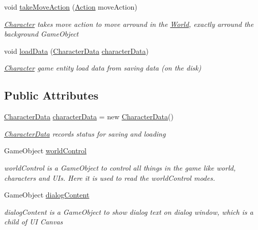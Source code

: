\begin{DoxyCompactItemize}
void \hyperlink{classdoki_unity_1_1_character_a1531b23b9fe3dd18c6ed37ce6d67c5a6}{take\+Move\+Action} (\hyperlink{classdoki_script_setting_1_1_action}{Action} move\+Action)
\begin{DoxyCompactList}\small\item\em \hyperlink{classdoki_unity_1_1_character}{Character} takes move action to move arround in the \hyperlink{classdoki_unity_1_1_world}{World}, exactly arround the background Game\+Object \end{DoxyCompactList}\item 
void \hyperlink{classdoki_unity_1_1_character_a9cfc21b81d39cdb038dc074705603aea}{load\+Data} (\hyperlink{classdoki_unity_1_1_character_data}{Character\+Data} \hyperlink{classdoki_unity_1_1_character_ae450f6f076561552e6a6dfe900377c17}{character\+Data})
\begin{DoxyCompactList}\small\item\em \hyperlink{classdoki_unity_1_1_character}{Character} game entity load data from saving data (on the disk) \end{DoxyCompactList}\end{DoxyCompactItemize}
\subsection*{Public Attributes}
\begin{DoxyCompactItemize}
\item 
\hyperlink{classdoki_unity_1_1_character_data}{Character\+Data} \hyperlink{classdoki_unity_1_1_character_ae450f6f076561552e6a6dfe900377c17}{character\+Data} = new \hyperlink{classdoki_unity_1_1_character_data}{Character\+Data}()
\begin{DoxyCompactList}\small\item\em \hyperlink{classdoki_unity_1_1_character_data}{Character\+Data} records status for saving and loading \end{DoxyCompactList}\item 
Game\+Object \hyperlink{classdoki_unity_1_1_character_a914f000a12efc5a53d6f0893cdccd5da}{world\+Control}
\begin{DoxyCompactList}\small\item\em world\+Control is a Game\+Object to control all things in the game like world, characters and U\+Is. Here it is used to read the world\+Control modes. \end{DoxyCompactList}\item 
Game\+Object \hyperlink{classdoki_unity_1_1_character_aa8f3d81d111e099a3a85fcb81ce09f32}{dialog\+Content}
\begin{DoxyCompactList}\small\item\em dialog\+Content is a Game\+Object to show dialog text on dialog window, which is a child of UI Canvas \end{DoxyCompactList}\end{DoxyCompactItemize}


